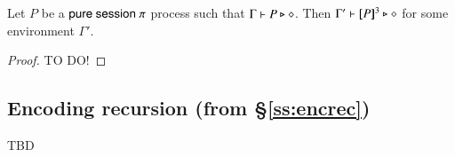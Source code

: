 \begin{proposition}
	Let $P$ be a $\mathsf{pure\ session\ }\pi$ process  such that  $\Gamma \vdash P \triangleright \diamond$. 
	Then $\Gamma' \vdash [\!\![P]\!\!]^3 \triangleright \diamond$
	for some environment $\Gamma'$.
\end{proposition}

\begin{proof} TO DO!
\end{proof}


\subsection{Encoding recursion (from \S\ref{ss:encrec})}
TBD
